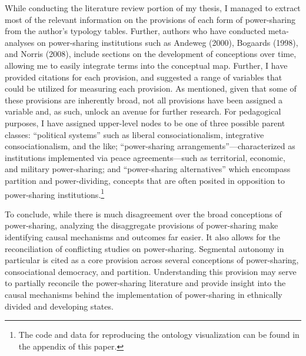 \documentclass[12pt]{article}
\begin{document}
While conducting the literature review portion of my thesis, I managed to extract most of the relevant information on the provisions of each form of power-sharing from the author’s typology tables. Further, authors who have conducted meta-analyses on power-sharing institutions such as Andeweg (2000), Bogaards (1998), and Norris (2008), include sections on the development of conceptions over time, allowing me to easily integrate terms into the conceptual map. Further, I have provided citations for each provision, and suggested a range of variables that could be utilized for measuring each provision. As mentioned, given that some of these provisions are inherently broad, not all provisions have been assigned a variable and, as such, unlock an avenue for further research. For pedagogical purposes, I have assigned upper-level nodes to be one of three possible parent classes: ``political systems'' such as liberal consociationalism, integrative consociationalism, and the like; ``power-sharing arrangements''---characterized as institutions implemented via peace agreements---such as territorial, economic, and military power-sharing; and ``power-sharing alternatives'' which encompass partition and power-dividing, concepts that are often posited in opposition to power-sharing institutions.\footnote{The code and data for reproducing the ontology visualization can be found in the appendix of this paper.}

To conclude, while there is much disagreement over the broad conceptions of power-sharing, analyzing the disaggregate provisions of power-sharing make identifying causal mechanisms and outcomes far easier. It also allows for the reconciliation of conflicting studies on power-sharing. Segmental autonomy in particular is cited as a core provision across several conceptions of power-sharing, consociational democracy, and partition. Understanding this provision may serve to partially reconcile the power-sharing literature and provide insight into the causal mechanisms behind the implementation of power-sharing in ethnically divided and developing states. 
\end{document}
